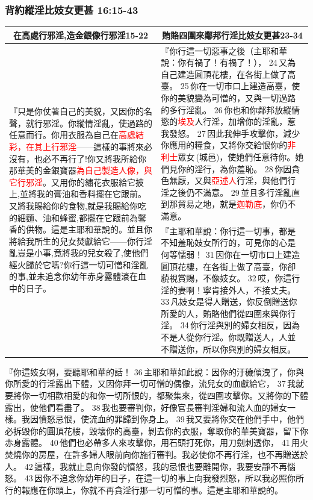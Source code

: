 \subsubsection{背約縱淫比妓女更甚 16:15-43}
\begin{table}[H]
\centering
\begin{tabular}{p{6.5cm}|p{11.0cm}}\hline\hline
\multicolumn{1}{c|}{在高處行邪淫,造金銀像行邪淫15-22}&\multicolumn{1}{c}{賄賂四圍來鄰邦行淫比妓女更甚23-34}\\\hline
\multirow{2}{6.7cm}{『只是你仗著自己的美貌，又因你的名聲，就行邪淫。你縱情淫亂，使過路的任意而行。你用衣服為自己在\textcolor{red}{高處結彩，在其上行邪淫}——這樣的事將來必沒有，也必不再行了!你又將我所給你那華美的金銀寶器\textcolor{red}{為自己製造人像，與它行邪淫}。又用你的繡花衣服給它披上,並將我的膏油和香料擺在它跟前。又將我賜給你的食物,就是我賜給你吃的細麵、油和蜂蜜,都擺在它跟前為馨香的供物。這是主耶和華說的。並且你將給我所生的兒女焚獻給它——你行淫亂豈是小事,竟將我的兒女殺了,使他們經火歸於它嗎?你行這一切可憎和淫亂的事,並未追念你幼年赤身露體滾在血中的日子。}
&『你行這一切惡事之後（主耶和華說：你有禍了！有禍了！）， 24 又為自己建造圓頂花樓，在各街上做了高臺。 25 你在一切市口上建造高臺，使你的美貌變為可憎的，又與一切過路的多行淫亂。 26 你也和你鄰邦放縱情慾的\textcolor{red}{埃及}人行淫，加增你的淫亂，惹我發怒。 27 因此我伸手攻擊你，減少你應用的糧食，又將你交給恨你的\textcolor{red}{非利士}眾女 (城邑)，使她們任意待你。她們見你的淫行，為你羞恥。 28 你因貪色無厭，又與\textcolor{red}{亞述人}行淫，與他們行淫之後仍不滿意。 29 並且多行淫亂直到那貿易之地，就是\textcolor{red}{迦勒底}，你仍不滿意。\\\cline{2-2}
&『主耶和華說：你行這一切事，都是不知羞恥妓女所行的，可見你的心是何等懦弱！ 31 因你在一切市口上建造圓頂花樓，在各街上做了高臺，你卻藐視賞賜，不像妓女。 32 哎，你這行淫的妻啊！寧肯接外人，不接丈夫。 33 凡妓女是得人贈送，你反倒贈送你所愛的人，賄賂他們從四圍來與你行淫。 34 你行淫與別的婦女相反，因為不是人從你行淫。你既贈送人，人並不贈送你，所以你與別的婦女相反。\\\hline
\end{tabular}
\end{table}


『你這妓女啊，要聽耶和華的話！ 36 主耶和華如此說：因你的汙穢傾洩了，你與你所愛的行淫露出下體，又因你拜一切可憎的偶像，流兒女的血獻給它， 37 我就要將你一切相歡相愛的和你一切所恨的，都聚集來，從四圍攻擊你。又將你的下體露出，使他們看盡了。 38 我也要審判你，好像官長審判淫婦和流人血的婦女一樣。我因憤怒忌恨，使流血的罪歸到你身上。 39 我又要將你交在他們手中，他們必拆毀你的圓頂花樓，毀壞你的高臺，剝去你的衣服，奪取你的華美寶器，留下你赤身露體。 40 他們也必帶多人來攻擊你，用石頭打死你，用刀劍刺透你， 41 用火焚燒你的房屋，在許多婦人眼前向你施行審判。我必使你不再行淫，也不再贈送於人。 42 這樣，我就止息向你發的憤怒，我的忌恨也要離開你，我要安靜不再惱怒。 43 因你不追念你幼年的日子，在這一切的事上向我發烈怒，所以我必照你所行的報應在你頭上，你就不再貪淫行那一切可憎的事。這是主耶和華說的。

